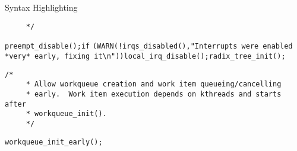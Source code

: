 \begin{frame}{Syntax Highlighting}
\begin{verbatim}
	 */\end{verbatim}\leavevmode\newline\tab\color{Aquamarine}\verb$preempt_disable$\color{Fuchsia}\verb$($\color{Fuchsia}\verb$)$\color{Fuchsia}\verb$;$\newline\tab\color{BurntOrange}\verb$if$ \color{Fuchsia}\verb$($\color{Aquamarine}\verb$WARN$\color{Fuchsia}\verb$($\color{Goldenrod}\verb$!$\color{Aquamarine}\verb$irqs_disabled$\color{Fuchsia}\verb$($\color{Fuchsia}\verb$)$\color{Fuchsia}\verb$,$\newline\tab\tab \color{Emerald}\verb$"Interrupts were enabled *very* early, fixing it\n"$\color{Fuchsia}\verb$)$\color{Fuchsia}\verb$)$\newline\tab\tab\color{Aquamarine}\verb$local_irq_disable$\color{Fuchsia}\verb$($\color{Fuchsia}\verb$)$\color{Fuchsia}\verb$;$\newline\tab\color{Aquamarine}\verb$radix_tree_init$\color{Fuchsia}\verb$($\color{Fuchsia}\verb$)$\color{Fuchsia}\verb$;$\newline\newline\tab\color{Rhodamine}\begin{verbatim}/*
	 * Allow workqueue creation and work item queueing/cancelling
	 * early.  Work item execution depends on kthreads and starts after
	 * workqueue_init().
	 */\end{verbatim}\leavevmode\newline\tab\color{Aquamarine}\verb$workqueue_init_early$\color{Fuchsia}\verb$($\color{Fuchsia}\verb$)$\color{Fuchsia}\verb$;$
\end{frame}
